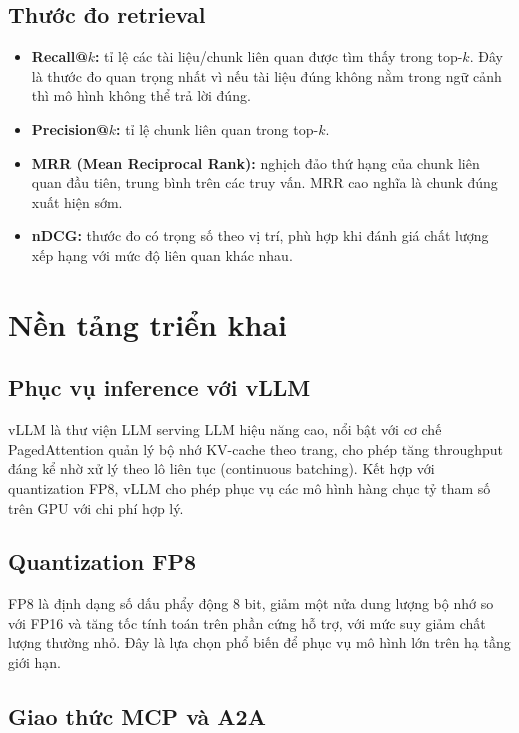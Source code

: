 \subsection{Thước đo retrieval}

\begin{itemize}
  \item \textbf{Recall@$k$:} tỉ lệ các tài liệu/chunk liên quan được tìm thấy trong top-$k$.
  Đây là thước đo quan trọng nhất vì nếu tài liệu đúng không nằm trong ngữ cảnh thì mô hình
  không thể trả lời đúng.
  \item \textbf{Precision@$k$:} tỉ lệ chunk liên quan trong top-$k$.
  \item \textbf{MRR (Mean Reciprocal Rank):} nghịch đảo thứ hạng của chunk liên quan đầu tiên,
  trung bình trên các truy vấn. MRR cao nghĩa là chunk đúng xuất hiện sớm.
  \item \textbf{nDCG:} thước đo có trọng số theo vị trí, phù hợp khi đánh giá chất lượng
  xếp hạng với mức độ liên quan khác nhau.
\end{itemize}

\section{Nền tảng triển khai}
\label{sec:infra}

\subsection{Phục vụ inference với vLLM}

vLLM \cite{kwon2023vllm,vllm2024} là thư viện LLM serving LLM hiệu năng cao, nổi bật với cơ chế
PagedAttention quản lý bộ nhớ KV-cache theo trang, cho phép tăng throughput đáng kể nhờ
xử lý theo lô liên tục (continuous batching). Kết hợp với quantization FP8, vLLM cho phép
phục vụ các mô hình hàng chục tỷ tham số trên GPU với chi phí hợp lý.

\subsection{Quantization FP8}

FP8 là định dạng số dấu phẩy động 8 bit, giảm một nửa dung lượng bộ nhớ so với FP16 và
tăng tốc tính toán trên phần cứng hỗ trợ, với mức suy giảm chất lượng thường nhỏ. Đây là
lựa chọn phổ biến để phục vụ mô hình lớn trên hạ tầng giới hạn.

\subsection{Giao thức MCP và A2A}


